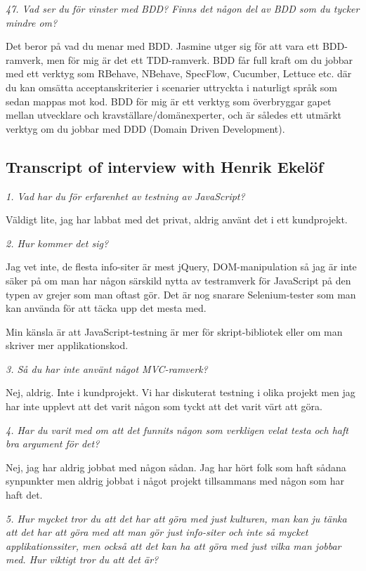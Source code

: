\documentclass[11pt]{article}
\begin{document}
\emph{47. Vad ser du för vinster med BDD? Finns det någon del av BDD som du tycker mindre om?}

Det beror på vad du menar med BDD. Jasmine utger sig för att vara ett BDD-ramverk, men för mig är det ett TDD-ramverk. BDD får full kraft om du jobbar med ett verktyg som RBehave, NBehave, SpecFlow, Cucumber, Lettuce etc. där du kan omsätta acceptanskriterier i scenarier uttryckta i naturligt språk som sedan mappas mot kod. BDD för mig är ett verktyg som överbryggar gapet mellan utvecklare och kravställare/domänexperter, och är således ett utmärkt verktyg om du jobbar med DDD (Domain Driven Development).


\subsection*{Transcript of interview with Henrik Ekelöf}

\emph{1. Vad har du för erfarenhet av testning av JavaScript?}

Väldigt lite, jag har labbat med det privat, aldrig använt det i ett kundprojekt.

\emph{2. Hur kommer det sig?}

Jag vet inte, de flesta info-siter är mest jQuery, DOM-manipulation så jag är inte säker på om man har någon särskild nytta av testramverk för JavaScript på den typen av grejer som man oftast gör. Det är nog snarare Selenium-tester som man kan använda för att täcka upp det mesta med.

Min känsla är att JavaScript-testning är mer för skript-bibliotek eller om man skriver mer applikationskod.

\emph{3. Så du har inte använt något MVC-ramverk?}

Nej, aldrig. Inte i kundprojekt. Vi har diskuterat testning i olika projekt men jag har inte upplevt att det varit någon som tyckt att det varit värt att göra.

\emph{4. Har du varit med om att det funnits någon som verkligen velat testa och haft bra argument för det?}

Nej, jag har aldrig jobbat med någon sådan. Jag har hört folk som haft sådana synpunkter men aldrig jobbat i något projekt tillsammans med någon som har haft det.

\emph{5. Hur mycket tror du att det har att göra med just kulturen, man kan ju tänka att det har att göra med att man gör just info-siter och inte så mycket applikationssiter, men också att det kan ha att göra med just vilka man jobbar med. Hur viktigt tror du att det är?}
\end{document}

